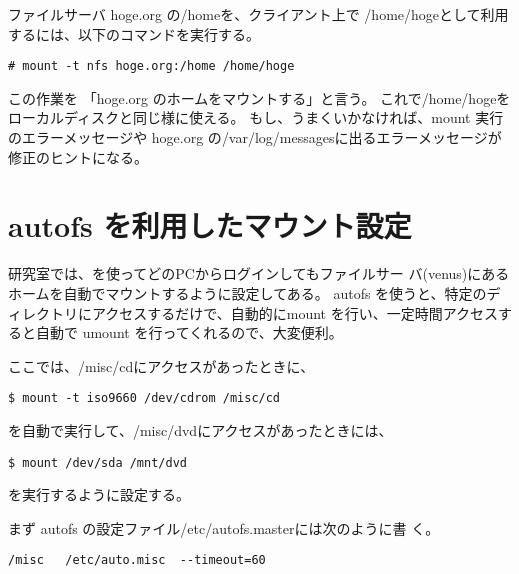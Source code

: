 \documentclass{jreport}
\begin{document}
ファイルサーバ hoge.org の{\ttfamily /home}を、クライアント上で
{\ttfamily /home/hoge}として利用するには、以下のコマンドを実行する。
\begin{screen}
\begin{verbatim}
# mount -t nfs hoge.org:/home /home/hoge
\end{verbatim}
\end{screen}

この作業を 「hoge.org のホームをマウントする」と言う。
これで{\ttfamily /home/hoge}をローカルディスクと同じ様に使える。
もし、うまくいかなければ、mount 実行のエラーメッセージや
hoge.org の{\ttfamily /var/log/messages}に出るエラーメッセージが
修正のヒントになる。



\section{autofs を利用したマウント設定\label{sec:autofs}}


研究室では、を使ってどのPCからログインしてもファイルサー
バ(venus)にあるホームを自動でマウントするように設定してある。
autofs を使うと、特定のディレクトリにアクセスするだけで、自動的にmount
を行い、一定時間アクセスすると自動で umount を行ってくれるので、大変便利。

ここでは、{\ttfamily /misc/cd}にアクセスがあったときに、
\begin{screen}
\begin{verbatim}
$ mount -t iso9660 /dev/cdrom /misc/cd
\end{verbatim}
\end{screen}

を自動で実行して、{\ttfamily /misc/dvd}にアクセスがあったときには、
\begin{screen}
\begin{verbatim}
$ mount /dev/sda /mnt/dvd
\end{verbatim}
\end{screen}

を実行するように設定する。

まず autofs の設定ファイル{\ttfamily /etc/autofs.master}には次のように書
く。
\begin{screen}
\begin{verbatim}
/misc   /etc/auto.misc  --timeout=60
\end{verbatim}
\end{screen}
\end{document}
